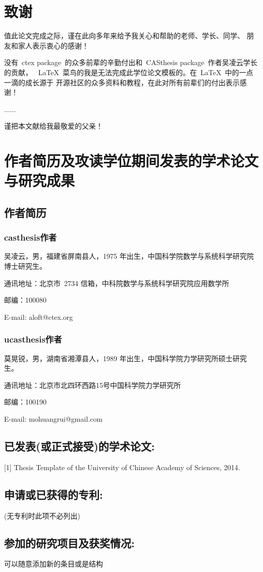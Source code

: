 \chapter{致\quad 谢}

值此论文完成之际，谨在此向多年来给予我关心和帮助的老师、学长、同学、
朋友和家人表示衷心的感谢！

没有~ctex package~的众多前辈的辛勤付出和~CASthesis package~作者吴凌云学长的贡献，
~\LaTeX{}~菜鸟的我是无法完成此学位论文模板的。在~\LaTeX{}~中的一点一滴的成长源于
开源社区的众多资料和教程，在此对所有前辈们的付出表示感谢！

......

谨把本文献给我最敬爱的父亲！


\chapter{作者简历及攻读学位期间发表的学术论文与研究成果}

\section*{作者简历}

\subsection*{casthesis作者}

吴凌云，男，福建省屏南县人，1975 年出生，中国科学院数学与系统科学研究院博士研究生。

通讯地址：北京市~2734 信箱，中科院数学与系统科学研究院应用数学所

邮编：100080

E-mail: aloft@ctex.org

\subsection*{ucasthesis作者}

莫晃锐，男，湖南省湘潭县人，1989 年出生，中国科学院力学研究所硕士研究生。

通讯地址：北京市北四环西路15号中国科学院力学研究所

邮编：100190

E-mail: mohuangrui@gmail.com

\section*{已发表(或正式接受)的学术论文:}

[1] Thesis Template of the University of Chinese Academy of Sciences, 2014.

\section*{申请或已获得的专利:}

(无专利时此项不必列出)

\section*{参加的研究项目及获奖情况:}

可以随意添加新的条目或是结构


